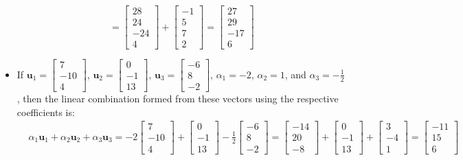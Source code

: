 \documentclass{article}
\begin{document}
\begin{itemize}
\[= \begin{bmatrix} 28 \\ 24 \\ -24 \\ 4 \end{bmatrix} + \begin{bmatrix} -1 \\ 5 \\ 7 \\ 2 \end{bmatrix}
= \begin{bmatrix} 27 \\ 29 \\ -17 \\ 6 \end{bmatrix}\]
\item If \(\mathbf{u}_1 = \begin{bmatrix} 7 \\ -10 \\ 4 \end{bmatrix}\), \(\mathbf{u}_2 = \begin{bmatrix} 0 \\ -1 \\ 13 \end{bmatrix}\), \(\mathbf{u}_3 = \begin{bmatrix} -6 \\ 8 \\ -2 \end{bmatrix}\), \(\alpha_1 = -2\), \(\alpha_2 = 1\), and \(\alpha_3 = -\frac{1}{2}\), then the linear combination formed from these vectors using the respective coefficients is:
\begin{align*}
& \alpha_1\mathbf{u}_1 + \alpha_2\mathbf{u}_2 + \alpha_3\mathbf{u}_3 
= -2\begin{bmatrix} 7 \\ -10 \\ 4 \end{bmatrix} + \begin{bmatrix} 0 \\ -1 \\ 13 \end{bmatrix} - \frac{1}{2}\begin{bmatrix} -6 \\ 8 \\ -2 \end{bmatrix} 
= \begin{bmatrix} -14 \\ 20 \\ -8 \end{bmatrix} + \begin{bmatrix} 0 \\ -1 \\ 13 \end{bmatrix} + \begin{bmatrix} 3 \\ -4 \\ 1 \end{bmatrix} 
= \begin{bmatrix} -11 \\ 15 \\ 6 \end{bmatrix}
\end{align*}
\end{itemize}
\end{document}

